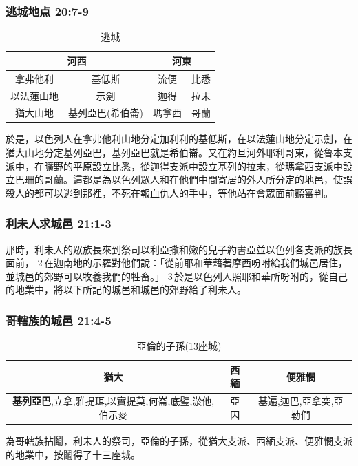 \subsubsection{逃城地点 20:7-9}
\begin{table}
\centering
\vspace{-1.cm}
\begin{tabular}{|c|c||c|c|}\hline\hline
 \multicolumn{2}{|m{5cm}||}{\centering 河西} & \multicolumn{2}{m{2.5cm}|}{\centering 河東} \\\hline
 拿弗他利 &基低斯&流便&比悉    \\\hline
 以法蓮山地&示劍& 迦得&拉末  \\\hline
 猶大山地&基列亞巴(希伯崙)&瑪拿西&哥蘭 \\\hline
\end{tabular}
\caption{逃城}
\end{table}
於是，以色列人在拿弗他利山地分定加利利的基低斯，在以法蓮山地分定示劍，在猶大山地分定基列亞巴，基列亞巴就是希伯崙。又在約旦河外耶利哥東，從魯本支派中，在曠野的平原設立比悉，從迦得支派中設立基列的拉末，從瑪拿西支派中設立巴珊的哥蘭。這都是為以色列眾人和在他們中間寄居的外人所分定的地邑，使誤殺人的都可以逃到那裡，不死在報血仇人的手中，等他站在會眾面前聽審判。


   

\subsubsection{利未人求城邑 21:1-3}
那時，利未人的眾族長來到祭司以利亞撒和嫩的兒子約書亞並以色列各支派的族長面前， 2 在迦南地的示羅對他們說：「從前耶和華藉著摩西吩咐給我們城邑居住，並城邑的郊野可以牧養我們的牲畜。」 3 於是以色列人照耶和華所吩咐的，從自己的地業中，將以下所記的城邑和城邑的郊野給了利未人。

\subsubsection{哥轄族的城邑 21:4-5}
\begin{table}[H]
\centering
\begin{tabular}{|c|c|c|}
\hline
\hline
 猶大& 西緬& 便雅憫\\\hline
 \textbf{基列亞巴},立拿,雅提珥,以實提莫,何崙,底璧,淤他,伯示麥& 亞因& 基遍,迦巴,亞拿突,亞勒們\\\hline
\end{tabular}
\caption{亞倫的子孫(13座城)}
\end{table}
為哥轄族拈鬮，利未人的祭司，亞倫的子孫，從猶大支派、西緬支派、便雅憫支派的地業中，按鬮得了十三座城。


